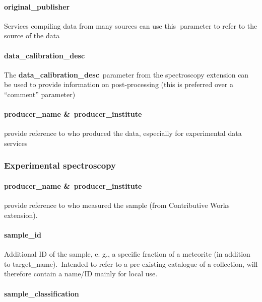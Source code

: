 \documentclass[11pt,a4paper]{ivoa}
\begin{document}
\paragraph{original\_publisher}

Services compiling data from many sources can use this\textbf{ }parameter to refer to the source of the data

\paragraph{data\_calibration\_desc}

The\textbf{ \textbf{data\_calibration\_desc}} parameter from the spectroscopy extension can be used to provide information on post-processing (this is preferred over a ``comment'' parameter)

\paragraph{producer\_name \& producer\_institute\\}

provide reference to who produced the data, especially for experimental data services

\subsubsection{Experimental spectroscopy\\}

\paragraph{producer\_name \& producer\_institute}

provide reference to who measured the sample (from Contributive Works extension).

\paragraph{sample\_id}

Additional ID of the sample, e. g., a specific fraction of a meteorite (in addition to target\_name). Intended to refer to a pre-existing catalogue of a collection, will therefore contain a name/ID mainly for local use. 

\paragraph{sample\_classification}
\end{document}
